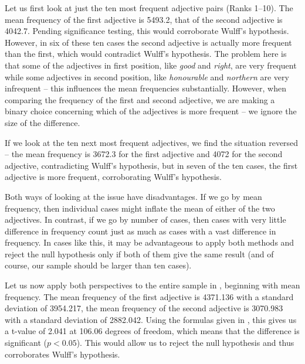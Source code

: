 Let us first look at just the ten most frequent adjective  pairs (Ranks 1--10). The mean  frequency  of the first adjective  is 5493.2, that of the second adjective  is 4042.7. Pending significance testing, this would corroborate Wulff's hypothesis. However, in six of these ten cases the second adjective  is actually more frequent than the first, which would contradict Wulff's hypothesis. The problem here is that some of the adjectives  in first position, like \textit{good} and \textit{right}, are very frequent while some adjectives  in second position, like \textit{honourable} and \textit{northern} are very infrequent -- this influences the mean  frequencies  substantially. However, when comparing the frequency of the first and second adjective,  we are making a binary choice concerning which of the adjectives  is more frequent -- we ignore the size of the difference.

If we look at the ten next most frequent adjectives,  we find the situation reversed -- the mean  frequency is 3672.3 for the first adjective  and 4072 for the second adjective,  contradicting Wulff's hypothesis, but in seven of the ten cases, the first adjective  is more frequent,  corroborating Wulff's hypothesis.

Both ways of looking at the issue have disadvantages. If we go by mean  frequency, then individual cases might inflate the mean of either of the two adjectives.  In contrast, if we go by number of cases, then cases with very little difference in frequency  count just as much as cases with a vast difference in frequency. In cases like this, it may be advantageous to apply both methods and reject the null hypothesis only if both of them give the same result (and of course, our sample should be larger than ten cases).

Let us now apply both perspectives to the entire sample in , beginning with mean  frequency. The mean frequency of the first adjective  is \num{4371.136} with a standard deviation of \num{3954.217}, the mean frequency of the second adjective  is \num{3070.983} with a standard deviation of \num{2882.042}. Using the formulas given in , this gives us a t\hyp{}value of \num{2.041} at \num{106.06} degrees of freedom, which means that the difference is significant ($p < 0.05$). This would allow us to reject the null hypothesis and thus corroborates Wulff's hypothesis.

